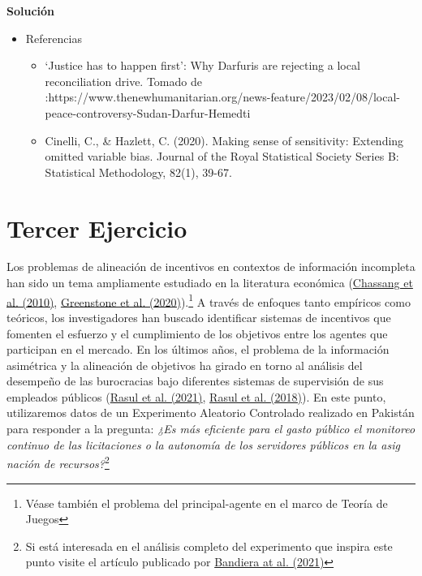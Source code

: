 \documentclass[a4paper, answers, addpoints, 11pt]{exam}
\newenvironment{solucion}{%
  \begin{mdframed}[
    backgroundcolor=blue!5,    %
    linecolor=blue!50,          %
    linewidth=2pt,              %
    leftmargin=10pt,            %
    rightmargin=8pt,           %
    topline=true,              %
    bottomline=true,            %
    roundcorner=10pt,           %
    innerleftmargin=10pt,       %
    innerrightmargin=10pt,      %
    innerbottommargin=10pt,     %
    innertopmargin=10pt         %
  ]%
  \begin{tcolorbox}[colframe=blue!50!black, colback=blue!50, coltitle=white, sharp corners=all, boxrule=1mm, width=\textwidth, halign=left, valign=center, top=0mm, bottom=0mm, left=0mm, right=0mm] \textbf{Solución} \end{tcolorbox} }{\end{mdframed}}
\begin{document}
\begin{enumerate} [resume]
\begin{solucion}
\begin{itemize}
\item Referencias 
\begin{itemize}
    \item ‘Justice has to happen first’: Why Darfuris are rejecting a local reconciliation drive. Tomado de :https://www.thenewhumanitarian.org/news-feature/2023/02/08/local-peace-controversy-Sudan-Darfur-Hemedti
    \item Cinelli, C., \& Hazlett, C. (2020). Making sense of sensitivity: Extending omitted variable bias. Journal of the Royal Statistical Society
Series B: Statistical Methodology, 82(1), 39-67.
\end{itemize}

    
       
   \end{itemize}
       

        \end{solucion}
      
        

\end{enumerate}
\section*{Tercer Ejercicio}
Los problemas de alineación de incentivos en contextos de información incompleta han sido un tema ampliamente estudiado en la literatura económica (\href{https://www.nber.org/papers/w16343}{Chassang et al. (2010)}, \href{https://www.nber.org/papers/w27502}{Greenstone et al. (2020)}).\footnote{\footnotesize{Véase también el problema del principal-agente en el marco de Teoría de Juegos}} A través de enfoques tanto empíricos como teóricos, los investigadores han buscado identificar sistemas de incentivos que fomenten el esfuerzo y el cumplimiento de los objetivos entre los agentes que participan en el mercado. En los últimos años, el problema de la información asimétrica y la alineación de objetivos ha girado en torno al análisis del desempeño de las burocracias bajo diferentes sistemas de supervisión de sus empleados públicos (\href{https://academic.oup.com/jpart/article/31/2/259/5974047}{Rasul et al. (2021)}, \href{https://academic.oup.com/ej/article-abstract/128/608/413/5068981?redirectedFrom=fulltext}{Rasul et al. (2018)}). En este punto, utilizaremos datos de un Experimento Aleatorio Controlado realizado en Pakistán para responder a la pregunta: \textit{¿Es más eficiente para el gasto público el monitoreo continuo de las licitaciones o la autonomía de los servidores públicos en la asig
nación de recursos?}\footnote{\footnotesize{Si está interesada en el análisis completo del experimento que inspira este punto visite el artículo publicado por \href{https://academic.oup.com/qje/article-abstract/136/4/2195/6354797?redirectedFrom=fulltext}{Bandiera at al. (2021)}}}
\end{document}
